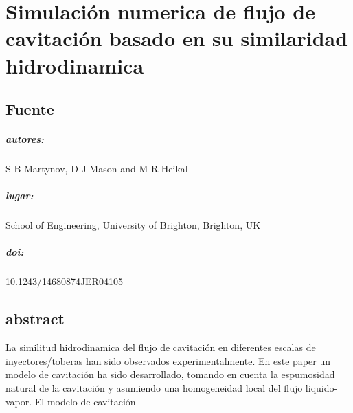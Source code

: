 \chapter{Simulación numerica de flujo de cavitación basado en su similaridad hidrodinamica}
\section{Fuente}
\paragraph{autores: } S B Martynov, D J Mason and M R Heikal
\paragraph{lugar: } School of Engineering, University of Brighton, Brighton, UK
\paragraph{doi: }10.1243/14680874JER04105
\section{abstract}
La similitud hidrodinamica del flujo de cavitación en diferentes escalas de inyectores/toberas
han sido observados experimentalmente. En este paper un modelo de cavitación 
ha sido desarrollado, tomando en cuenta la espumosidad natural de la cavitación
y asumiendo una homogeneidad local del flujo liquido-vapor.
El modelo de cavitación 
